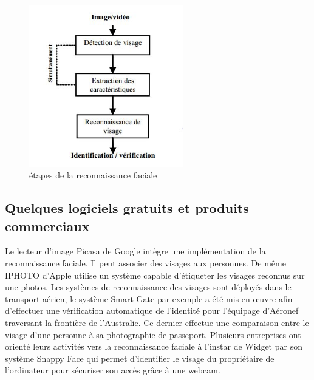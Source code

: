 \begin{figure}[htbp]
	\centering
		\includegraphics[height=200pt]{etape.JPG}
	\caption{étapes de la reconnaissance faciale}
	\label{fig:etape}
\end{figure}

 
	\subsection{Quelques logiciels gratuits et produits commerciaux}
Le lecteur d'image Picasa de Google intègre une implémentation de la reconnaissance faciale. Il peut associer des visages aux personnes. De même IPHOTO d'Apple utilise un système capable d'étiqueter les visages reconnus sur une photos.  Les systèmes de reconnaissance des visages sont déployés  dans le  transport aérien, le système \og Smart  Gate \fg{} par exemple a été mis en  œuvre  afin d'effectuer  une vérification automatique de l'identité pour l'équipage d'Aéronef traversant la frontière de  l'Australie. Ce dernier  effectue  une  comparaison  entre  le  visage  d'une  personne  à  sa  photographie  de passeport.
Plusieurs entreprises ont orienté leurs activités vers la reconnaissance faciale à l'instar de \og Widget\fg{} par son système \og  Snappy Face\fg{} qui permet d'identifier le visage du propriétaire de l'ordinateur pour sécuriser son accès grâce à une webcam. 


